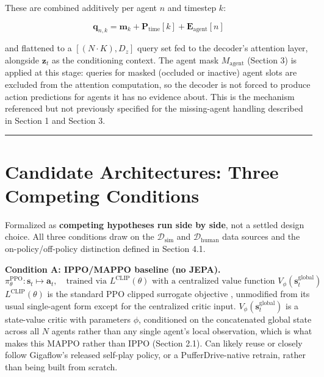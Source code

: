 \documentclass[11pt]{article}
\begin{document}
These are combined additively per agent \(n\) and timestep \(k\):

\[\mathbf{q}_{n,k} = \mathbf{m}_k + \mathbf{P}_{\text{time}}[k] + \mathbf{E}_{\text{agent}}[n]\]

and flattened to a \([(N \cdot K), D_z]\) query set fed to the decoder's attention layer, alongside \(\mathbf{z}_t\) as the conditioning context. The agent mask \(M_{\text{agent}}\) (Section 3) is applied at this stage: queries for masked (occluded or inactive) agent slots are excluded from the attention computation, so the decoder is not forced to produce action predictions for agents it has no evidence about. This is the mechanism referenced but not previously specified for the missing-agent handling described in Section 1 and Section 3.

\begin{center}\rule{0.5\linewidth}{0.5pt}\end{center}

\hypertarget{candidate-architectures-three-competing-conditions}{%
\section{Candidate Architectures: Three Competing Conditions}\label{candidate-architectures-three-competing-conditions}}

Formalized as \textbf{competing hypotheses run side by side}, not a settled design choice. All three conditions draw on the \(\mathcal{D}_{\text{sim}}\) and \(\mathcal{D}_{\text{human}}\) data sources and the on-policy/off-policy distinction defined in Section 4.1.

\textbf{Condition A: IPPO/MAPPO baseline (no JEPA).}
\[\pi_\theta^{\text{PPO}}: \mathbf{s}_t \mapsto \mathbf{a}_t, \quad \text{trained via } L^{\text{CLIP}}(\theta) \text{ with a centralized value function } V_\phi(\mathbf{s}_t^{\text{global}})\]
\(L^{\text{CLIP}}(\theta)\) is the standard PPO clipped surrogate objective \citep{schulman2017ppo}, unmodified from its usual single-agent form except for the centralized critic input. \(V_\phi(\mathbf{s}_t^{\text{global}})\) is a state-value critic with parameters \(\phi\), conditioned on the concatenated global state across all \(N\) agents rather than any single agent's local observation, which is what makes this MAPPO rather than IPPO (Section 2.1). Can likely reuse or closely follow Gigaflow's released self-play policy, or a PufferDrive-native retrain, rather than being built from scratch.
\end{document}
